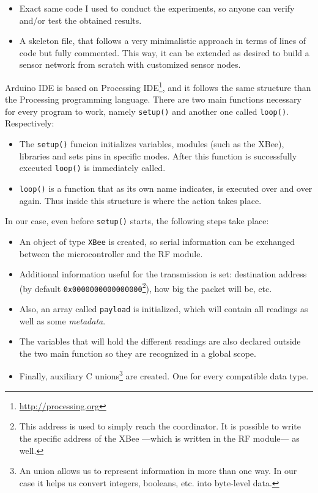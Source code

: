 \begin{itemize}
    \item Exact same code I used to conduct the experiments, so anyone can verify and/or test the obtained results.
    \item A skeleton file, that follows a very minimalistic approach in terms of lines of code but fully commented. This way, it can be extended as desired to build a sensor network from scratch with customized sensor nodes.
\end{itemize}

Arduino IDE is based on Processing IDE\footnote{\url{http://processing.org}}, and it follows the same structure than the Processing programming language. There are two main functions necessary for every program to work, namely \texttt{setup()} and another one called \texttt{loop()}. Respectively:

\begin{itemize}
    \item The \texttt{setup()} funcion initializes variables, modules (such as the XBee), libraries and sets pins in specific modes. After this function is successfully executed \texttt{loop()} is immediately called.
    \item \texttt{loop()} is a function that as its own name indicates, is executed over and over again. Thus inside this structure is where the action takes place. 
\end{itemize}

In our case, even before \texttt{setup()} starts, the following steps take place:

\begin{itemize}
    \item An object of type \texttt{XBee} is created, so serial information can be exchanged between the microcontroller and the RF module. 
    \item Additional information useful for the transmission is set: destination address (by default \texttt{0x0000000000000000}\footnote{This address is used to simply reach the coordinator. It is possible to write the specific address of the XBee ---which is written in the RF module--- as well.}), how big the packet will be, etc.
    \item Also, an array called \texttt{payload} is initialized, which will contain all readings as well as some \emph{metadata}. 
    \item The variables that will hold the different readings are also declared outside the two main function so they are recognized in a global scope.
    \item Finally, auxiliary C unions\footnote{An union allows us to represent information in more than one way. In our case it helps us convert integers, booleans, etc. into byte-level data.} are created. One for every compatible data type.
\end{itemize}

